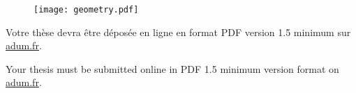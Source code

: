 \begin{figure}[h!tbp]
	\centering
	\texttt{[image: geometry.pdf]}
\end{figure}


Votre thèse devra être déposée en ligne en format PDF version 1.5 minimum sur \href{https://www.adum.fr/}{adum.fr}.

Your thesis must be submitted online in PDF 1.5 minimum version format on \href{https://www.adum.fr/}{adum.fr}.

